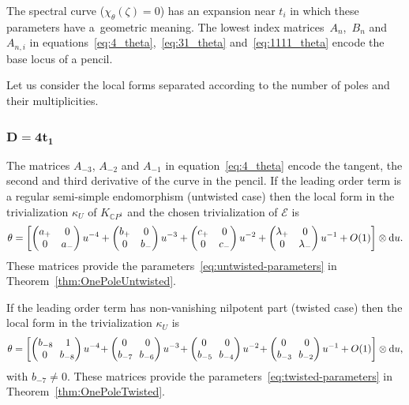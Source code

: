 \documentclass[pdftex]{sigma}
\newcommand{\CP}[1]{\mathbb{C}P^{#1}} %
\newcommand{\E}{{\mathcal E}} %
\renewcommand{\t}{\theta} %
\renewcommand{\d}{{\rm d}} %
\numberwithin{equation}{section}
\begin{document}
The spectral curve ($\chi_{\theta} (\zeta ) = 0$) has an expansion
near $t_i$ in which these parameters have a~geometric
meaning. The lowest index matrices~$A_n$,~$B_n$ and $A_{n,i}$ in equations~\eqref{eq:4_theta},~\eqref{eq:31_theta} and~\eqref{eq:1111_theta}
encode the base locus of a pencil.

Let us consider the local forms separated according to the number of poles and their multiplicities.

\subsubsection[$D=4 t_1$]{$\boldsymbol{D=4 t_1}$}\label{sssec:4}
The matrices $A_{-3}$, $A_{-2}$ and $A_{-1}$ in equation~\eqref{eq:4_theta} encode the tangent, the
second and third derivative of the curve in the pencil.
If the leading order term is a regular semi-simple endomorphism (untwisted case) then the local form in the trivialization $\kappa_U$
{of $K_{\CP1}$ and the chosen trivialization of $\E$} is
\begin{gather*}
 \t = \left[ \begin{pmatrix}
 a_+ & 0 \\
 0 & a_-
 \end{pmatrix} u^{-4}
				+
				\begin{pmatrix}
 b_+ & 0 \\
 0 & b_-
 \end{pmatrix} u^{-3}
				+
				\begin{pmatrix}
 c_+ & 0 \\
 0 & c_-
 \end{pmatrix} u^{-2}
				+
				\begin{pmatrix}
 \lambda_+ & 0 \\
 0 & \lambda_-
 \end{pmatrix} u^{-1}
				+ O(1)
 \right] \otimes \d u.
\end{gather*}
These matrices provide the parameters~\eqref{eq:untwisted-parameters} in Theorem~\ref{thm:OnePoleUntwisted}.

If the leading order term has non-vanishing nilpotent part (twisted
case) then the local form in the trivialization $\kappa_U$ is
\begin{gather*}
 \t = \left[ \begin{pmatrix}
 b_{-8}\! & 1 \\
 0	& \!b_{-8}
 \end{pmatrix} u^{-4}\!
 +
 \begin{pmatrix}
 0 & 0 \\
 b_{-7}\! & \!b_{-6}
 \end{pmatrix} u^{-3}\!
 +
 \begin{pmatrix}
 0 & 0 \\
 b_{-5}\! & \!b_{-4}
 \end{pmatrix} u^{-2}\!
 +
 \begin{pmatrix}
 0 & 0 \\
 b_{-3}\! & \!b_{-2}
 \end{pmatrix} u^{-1}
 + O(1)
 \right] \otimes \d u,
 \end{gather*}
with $b_{-7} \neq 0$. These matrices provide the parameters~\eqref{eq:twisted-parameters} in Theorem~\ref{thm:OnePoleTwisted}.
\end{document}
